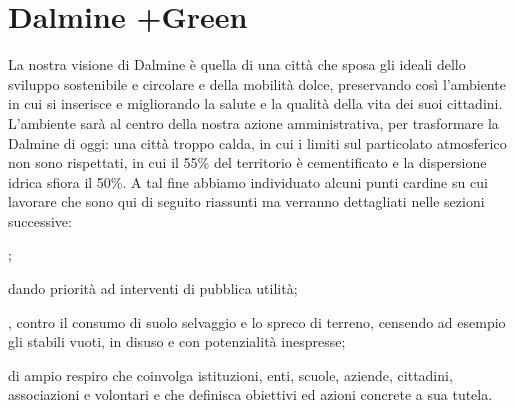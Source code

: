 \chapter{Dalmine +Green}
La nostra visione di Dalmine è quella di una città che sposa gli ideali dello sviluppo sostenibile e circolare e della mobilità dolce, preservando così l'ambiente in cui si inserisce e migliorando la salute e la qualità della vita dei suoi cittadini. L'ambiente sarà al centro della nostra azione amministrativa, per trasformare la Dalmine di oggi: una città troppo calda, in cui i limiti sul particolato atmosferico non sono rispettati, in cui il 55\% del territorio è cementificato e la dispersione idrica sfiora il 50\%. A tal fine abbiamo individuato alcuni punti cardine su cui lavorare che sono qui di seguito riassunti ma verranno dettagliati nelle sezioni successive:

;

 dando priorità ad interventi di pubblica utilità;

, contro il consumo di suolo selvaggio e lo spreco di terreno, censendo ad esempio gli stabili vuoti, in disuso e con potenzialità inespresse;

 di ampio respiro che coinvolga istituzioni, enti, scuole, aziende, cittadini, associazioni e volontari e che definisca obiettivi ed azioni concrete a sua tutela.







